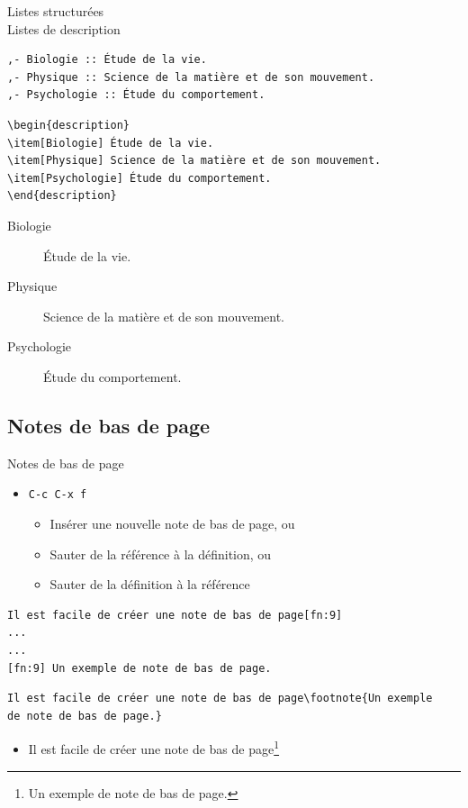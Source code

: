 \documentclass[presentation,t,hideothersubsections]{beamer}
\begin{document}
\begin{frame}[fragile,label=sec-2-6-5]{Listes structurées \\ Listes de description}
 \lstset{language=org,numbers=none}
\begin{lstlisting}
,- Biologie :: Étude de la vie.
,- Physique :: Science de la matière et de son mouvement.
,- Psychologie :: Étude du comportement.
\end{lstlisting}

\lstset{language=TeX,numbers=none}
\begin{lstlisting}
\begin{description}
\item[Biologie] Étude de la vie.
\item[Physique] Science de la matière et de son mouvement.
\item[Psychologie] Étude du comportement.
\end{description}
\end{lstlisting}

\begin{description}
\item[Biologie] Étude de la vie.
\item[Physique] Science de la matière et de son mouvement.
\item[Psychologie] Étude du comportement.
\end{description}
\end{frame}
\subsection{Notes de bas de page}
\label{sec-2-7}

\begin{frame}[fragile,label=sec-2-7-1]{Notes de bas de page}
 \begin{itemize}
\item \texttt{C-c C-x f}
\begin{itemize}
\item Insérer une nouvelle note de bas de page, ou
\item Sauter de la référence à la définition, ou
\item Sauter de la définition à la référence
\end{itemize}
\end{itemize}

\lstset{language=org,numbers=none}
\begin{lstlisting}
Il est facile de créer une note de bas de page[fn:9]
...
...
[fn:9] Un exemple de note de bas de page.
\end{lstlisting}

\lstset{language=TeX,numbers=none}
\begin{lstlisting}
Il est facile de créer une note de bas de page\footnote{Un exemple
de note de bas de page.}
\end{lstlisting}

\begin{itemize}
\item Il est facile de créer une note de bas de page\footnote{Un exemple de note de bas de page.}
\end{itemize}
\end{frame}
\end{document}
